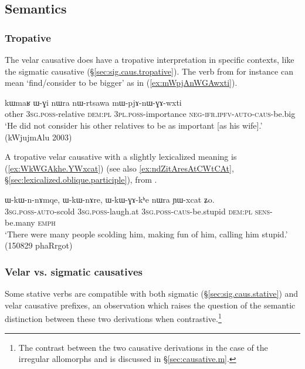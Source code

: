 \subsection{Semantics} \label{sec:velar.causative.semantics}
 
\subsubsection{Tropative} \label{sec:velar.causative.tropative}
 
 The velar causative does have a tropative interpretation in specific contexts, like the sigmatic causative (§\ref{sec:sig.caus.tropative}). The verb  from   for instance can mean `find/consider to be bigger' as in (\ref{ex:mWpjAnWGAwxti}).

 \begin{exe}
\ex \label{ex:mWpjAnWGAwxti}
\gll kɯmaʁ ɯ-ɣi nɯra nɯ-rtsawa mɯ-pjɤ-nɯ-ɣɤ-wxti \\
other \textsc{3sg}.\textsc{poss}-relative \textsc{dem}:\textsc{pl} \textsc{3pl}.\textsc{poss}-importance \textsc{neg}-\textsc{ifr}.\textsc{ipfv}-\textsc{auto}-\textsc{caus}-be.big \\
\glt `He did not consider his other relatives to be as important [as his wife].' (kWjujmAlu 2003)
\end{exe} 

A tropative velar causative with a slightly lexicalized meaning is   (\ref{ex:WkWGAkhe.YWxcat}) (see also \ref{ex:ndZitAresAtCWtCAt}, §\ref{sec:lexicalized.oblique.participle}), from .
 
 \begin{exe}
\ex \label{ex:WkWGAkhe.YWxcat}
\gll  ɯ-kɯ-n-nɤmqe, ɯ-kɯ-nɤre, ɯ-kɯ-ɣɤ-kʰe nɯra ɲɯ-xcat ʑo. \\
\textsc{3sg}.\textsc{poss}-\textsc{auto}-scold \textsc{3sg}.\textsc{poss}-laugh.at \textsc{3sg}.\textsc{poss}-\textsc{caus}-be.stupid \textsc{dem}:\textsc{pl} \textsc{sens}-be.many \textsc{emph} \\
\glt `There were many people scolding him, making fun of him, calling him stupid.' (150829 phaRrgot)
 \end{exe} 
 
\subsubsection{Velar vs. sigmatic causatives} \label{sec:velar.causative.vs.sigmatic.causative}
   
Some stative verbs are compatible with both sigmatic (§\ref{sec:sig.caus.stative}) and velar causative prefixes, an observation which raises the question of the semantic distinction between these two derivations when contrastive.\footnote{The contrast between the two causative derivations in the case of the irregular allomorphs  and  is discussed in §\ref{sec:causative.m}. }

